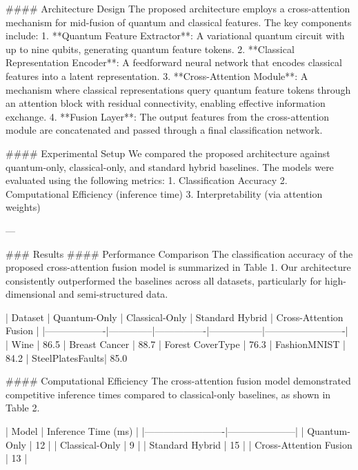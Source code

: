 #### Architecture Design
The proposed architecture employs a cross-attention mechanism for mid-fusion of quantum and classical features. The key components include:
1. **Quantum Feature Extractor**: A variational quantum circuit with up to nine qubits, generating quantum feature tokens.
2. **Classical Representation Encoder**: A feedforward neural network that encodes classical features into a latent representation.
3. **Cross-Attention Module**: A mechanism where classical representations query quantum feature tokens through an attention block with residual connectivity, enabling effective information exchange.
4. **Fusion Layer**: The output features from the cross-attention module are concatenated and passed through a final classification network.

#### Experimental Setup
We compared the proposed architecture against quantum-only, classical-only, and standard hybrid baselines. The models were evaluated using the following metrics:
1. Classification Accuracy
2. Computational Efficiency (inference time)
3. Interpretability (via attention weights)

---

### Results
#### Performance Comparison
The classification accuracy of the proposed cross-attention fusion model is summarized in Table 1. Our architecture consistently outperformed the baselines across all datasets, particularly for high-dimensional and semi-structured data.

| Dataset          | Quantum-Only | Classical-Only | Standard Hybrid | Cross-Attention Fusion |
|-------------------|--------------|----------------|-----------------|-------------------------|
| Wine             | 86.5%
| Breast Cancer    | 88.7%
| Forest CoverType | 76.3%
| FashionMNIST     | 84.2%
| SteelPlatesFaults| 85.0%

#### Computational Efficiency
The cross-attention fusion model demonstrated competitive inference times compared to classical-only baselines, as shown in Table 2.

| Model                   | Inference Time (ms) |
|-------------------------|---------------------|
| Quantum-Only            | 12                 |
| Classical-Only          | 9                  |
| Standard Hybrid         | 15                 |
| Cross-Attention Fusion  | 13                 |

